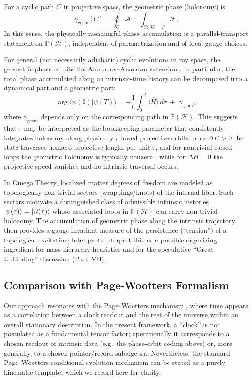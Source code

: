 For a cyclic path $C$ in projective space, the geometric phase (holonomy) is
\begin{equation}
    \gamma_{\mathrm{geom}}[C]=\oint_C \mathcal{A}=\int_{S:\,\partial S=C}\mathcal{F}.
\end{equation}
In this sense, the physically meaningful phase accumulation is a parallel-transport statement on $\mathbb{P}(\mathcal{H})$, independent of parametrization and of local gauge choices.

For general (not necessarily adiabatic) cyclic evolutions in ray space, the geometric phase admits the
Aharonov--Anandan extension \cite{AharonovAnandan1987}. In particular, the total phase accumulated along an
intrinsic-time history can be decomposed into a dynamical part and a geometric part:
\begin{equation}
    \arg \langle \psi(0)|\psi(T)\rangle
    =
    -\frac{1}{\hbar}\int_0^T \langle \hat H\rangle\, d\tau
    \;+\;
    \gamma_{\mathrm{geom}},
\end{equation}
where $\gamma_{\mathrm{geom}}$ depends only on the corresponding path in $\mathbb{P}(\mathcal{H})$.
This suggests that $\tau$ may be interpreted as the bookkeeping parameter that consistently integrates
holonomy along physically allowed projective orbits: once $\Delta H>0$ the state traverses nonzero projective
length per unit $\tau$, and for nontrivial closed loops the geometric holonomy is typically nonzero \cite{Berry1984,AharonovAnandan1987}, while for $\Delta H=0$ the
projective speed vanishes and no intrinsic traversal occurs.

In Omega Theory, localized matter degrees of freedom are modeled as topologically non-trivial sectors (wrappings/knots) of the internal fiber. Such sectors motivate a distinguished class of admissible intrinsic histories $\ket{\psi(\tau)}=\ket{\Omega(\tau)}$ whose associated loops in $\mathbb{P}(\mathcal{H})$ can carry non-trivial holonomy. The accumulation of geometric phase along the intrinsic trajectory then provides a gauge-invariant measure of the persistence (``tension'') of a topological excitation; later parts interpret this as a possible organizing ingredient for mass-hierarchy heuristics and for the speculative ``Great Unbinding'' discussion (Part~VII).

\subsection{Comparison with Page-Wootters Formalism}
Our approach resonates with the Page--Wootters mechanism \cite{PageWootters1983}, where time appears as a correlation between a clock readout and the rest of the universe within an overall stationary description. In the present framework, a ``clock'' is not postulated as a fundamental tensor factor; operationally it corresponds to a chosen readout of intrinsic data (e.g.\ the phase-orbit coding above) or, more generally, to a chosen pointer/record subalgebra. Nevertheless, the standard Page--Wootters conditional-evolution mechanism can be stated as a purely kinematic template, which we record here for clarity.

